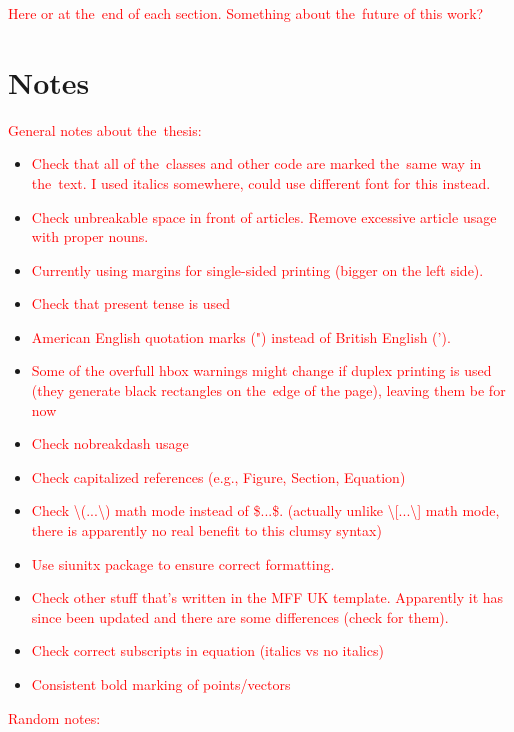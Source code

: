 	\textcolor{red}{Here or at the~end of each section. Something about the~future of this work?}
	
	\section*{Notes}
		\textcolor{red}{General notes about the~thesis:}
		\begin{itemize}[topsep=4pt,itemsep=2pt]
			\item \textcolor{red}{Check that all of the~classes and other code are marked the~same way in the~text. I used italics somewhere, could use different font for this instead.}
			\item \textcolor{red}{Check unbreakable space in front of articles. Remove excessive article usage with proper nouns.}
			\item \textcolor{red}{Currently using margins for single-sided printing (bigger on the left side).}
			\item \textcolor{red}{Check that present tense is used}
			\item \textcolor{red}{American English quotation marks (") instead of British English (').}
			\item \textcolor{red}{Some of the overfull hbox warnings might change if duplex printing is used (they generate black rectangles on the~edge of the page), leaving them be for now}
			\item \textcolor{red}{Check nobreakdash usage}
			\item \textcolor{red}{Check capitalized references (e.g., Figure, Section, Equation)}
			\item \textcolor{red}{Check \textbackslash(...\textbackslash) math mode instead of \$...\$. (actually unlike \textbackslash[...\textbackslash] math mode, there is apparently no real benefit to this clumsy syntax)}
			\item \textcolor{red}{Use siunitx package to ensure correct formatting.}
			\item \textcolor{red}{Check other stuff that's written in the MFF UK template. Apparently it has since been updated and there are some differences (check for them).}
			\item \textcolor{red}{Check correct subscripts in equation (italics vs no italics)}\\
			\item \textcolor{red}{Consistent bold marking of points/vectors}
		\end{itemize}
		\textcolor{red}{Random notes:}
